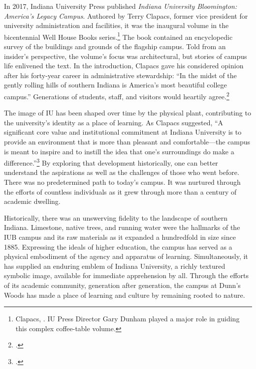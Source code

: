 \documentclass[
  american,
  letterpaper,
]{scrreprt}
\begin{document}
In 2017, Indiana University Press published \emph{Indiana University
Bloomington: America's Legacy Campus}. Authored by Terry Clapacs, former
vice president for university administration and facilities, it was the
inaugural volume in the bicentennial Well House Books series.\footnote{Clapacs,
  . IU
  Press Director Gary Dunham played a major role in guiding this complex
  coffee-table volume.} The book contained an encyclopedic survey of the
buildings and grounds of the flagship campus. Told from an insider's
perspective, the volume's focus was architectural, but stories of campus
life enlivened the text. In the introduction, Clapacs gave his
considered opinion after his forty-year career in administrative
stewardship: ``In the midst of the gently rolling hills of southern
Indiana is America's most beautiful college campus.'' Generations of
students, staff, and visitors would heartily agree.\footnote{.}

The image of IU has been shaped over time by the physical plant,
contributing to the university's identity as a place of learning. As
Clapacs suggested, ``A significant core value and institutional
commitment at Indiana University is to provide an environment that is
more than pleasant and comfortable---the campus is meant to inspire and
to instill the idea that one's surroundings do make a
difference.''\footnote{.} By
exploring that development historically, one can better understand the
aspirations as well as the challenges of those who went before. There
was no predetermined path to today's campus. It was nurtured through the
efforts of countless individuals as it grew through more than a century
of academic dwelling.

Historically, there was an unswerving fidelity to the landscape of
southern Indiana. Limestone, native trees, and running water were the
hallmarks of the IUB campus and its raw materials as it expanded a
hundredfold in size since 1885. Expressing the ideals of higher
education, the campus has served as a physical embodiment of the agency
and apparatus of learning. Simultaneously, it has supplied an enduring
emblem of Indiana University, a richly textured symbolic image,
available for immediate apprehension by all. Through the efforts of its
academic community, generation after generation, the campus at Dunn's
Woods has made a place of learning and culture by remaining rooted to
nature.
\end{document}
